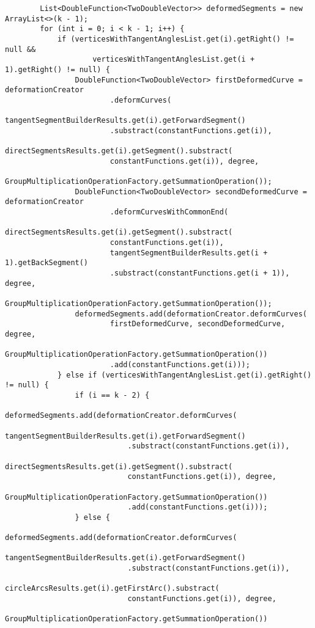 \begin{verbatim}
        List<DoubleFunction<TwoDoubleVector>> deformedSegments = new ArrayList<>(k - 1);
        for (int i = 0; i < k - 1; i++) {
            if (verticesWithTangentAnglesList.get(i).getRight() != null &&
                    verticesWithTangentAnglesList.get(i + 1).getRight() != null) {
                DoubleFunction<TwoDoubleVector> firstDeformedCurve = deformationCreator
                        .deformCurves(
                        tangentSegmentBuilderResults.get(i).getForwardSegment()
                        .substract(constantFunctions.get(i)),
                        directSegmentsResults.get(i).getSegment().substract(
                        constantFunctions.get(i)), degree,
                        GroupMultiplicationOperationFactory.getSummationOperation());
                DoubleFunction<TwoDoubleVector> secondDeformedCurve = deformationCreator
                        .deformCurvesWithCommonEnd(
                        directSegmentsResults.get(i).getSegment().substract(
                        constantFunctions.get(i)),
                        tangentSegmentBuilderResults.get(i + 1).getBackSegment()
                        .substract(constantFunctions.get(i + 1)), degree,
                        GroupMultiplicationOperationFactory.getSummationOperation());
                deformedSegments.add(deformationCreator.deformCurves(
                        firstDeformedCurve, secondDeformedCurve, degree,
                        GroupMultiplicationOperationFactory.getSummationOperation())
                        .add(constantFunctions.get(i)));
            } else if (verticesWithTangentAnglesList.get(i).getRight() != null) {
                if (i == k - 2) {
                    deformedSegments.add(deformationCreator.deformCurves(
                            tangentSegmentBuilderResults.get(i).getForwardSegment()
                            .substract(constantFunctions.get(i)),
                            directSegmentsResults.get(i).getSegment().substract(
                            constantFunctions.get(i)), degree,
                            GroupMultiplicationOperationFactory.getSummationOperation())
                            .add(constantFunctions.get(i)));
                } else {
                    deformedSegments.add(deformationCreator.deformCurves(
                            tangentSegmentBuilderResults.get(i).getForwardSegment()
                            .substract(constantFunctions.get(i)),
                            circleArcsResults.get(i).getFirstArc().substract(
                            constantFunctions.get(i)), degree,
                            GroupMultiplicationOperationFactory.getSummationOperation())

\end{verbatim}
